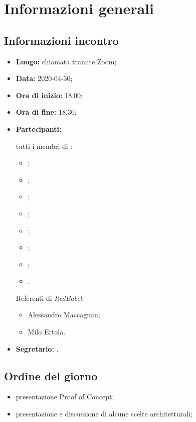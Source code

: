\section{Informazioni generali}
\subsection{Informazioni incontro}
\begin{itemize}
	\item \textbf{Luogo:} chiamata tramite Zoom;
	\item \textbf{Data:} 2020-04-30;
	\item \textbf{Ora di inizio:} 18.00;
	\item \textbf{Ora di fine:} 18.30;
	\item \textbf{Partecipanti:}

		tutti i membri di \Gruppo:
		\begin{itemize}
			\item \VB;
			\item \LB;
			\item \NF;
			\item \EG;
			\item \FJ;
			\item \MP;
			\item \AS;
			\item \AZ.
		\end{itemize}

		Referenti di \textit{RedBabel}:
		\begin{itemize}
			\item Alessandro Maccagnan;
			\item Milo Ertola.
		\end{itemize}
	\item \textbf{Segretario:} \FJ.
\end{itemize}

\subsection{Ordine del giorno}
\begin{itemize}
	\item presentazione Proof of Concept;
	\item presentazione e discussione di alcune scelte architetturali;
\end{itemize}
